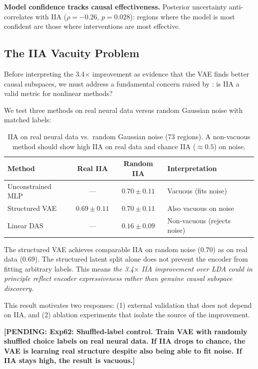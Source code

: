 \documentclass{article}
\newcommand{\pending}[1]{\textcolor{red!70!black}{\textbf{[PENDING: #1]}}}
\begin{document}
\textbf{Model confidence tracks causal effectiveness.} Posterior uncertainty anti-correlates with IIA ($\rho = -0.26$, $p = 0.028$): regions where the model is most confident are those where interventions are most effective.

\subsection{The IIA Vacuity Problem}
\label{sec:vacuity}

Before interpreting the 3.4$\times$ improvement as evidence that the VAE finds better causal subspaces, we must address a fundamental concern raised by \citet{sutter2025iia}: is IIA a valid metric for nonlinear methods?

We test three methods on real neural data versus random Gaussian noise with matched labels:

\begin{table}[h]
\centering
\small
\caption{IIA on real neural data vs.\ random Gaussian noise (73 regions). A non-vacuous method should show high IIA on real data and chance IIA ($\approx 0.5$) on noise.}
\label{tab:sutter}
\begin{tabular}{lccl}
\toprule
Method & Real IIA & Random IIA & Interpretation \\
\midrule
Unconstrained MLP & --- & $0.70 \pm 0.11$ & Vacuous (fits noise) \\
Structured VAE & $0.69 \pm 0.11$ & $0.70 \pm 0.11$ & Also vacuous on noise \\
Linear DAS & --- & $0.16 \pm 0.09$ & Non-vacuous (rejects noise) \\
\bottomrule
\end{tabular}
\end{table}

The structured VAE achieves comparable IIA on random noise ($0.70$) as on real data ($0.69$). The structured latent split alone does not prevent the encoder from fitting arbitrary labels. This means \emph{the 3.4$\times$ IIA improvement over LDA could in principle reflect encoder expressiveness rather than genuine causal subspace discovery.}

This result motivates two responses: (1) external validation that does not depend on IIA, and (2) ablation experiments that isolate the source of the improvement.

\pending{Exp62: Shuffled-label control. Train VAE with randomly shuffled choice labels on real neural data. If IIA drops to chance, the VAE is learning real structure despite also being able to fit noise. If IIA stays high, the result is vacuous.}
\end{document}
